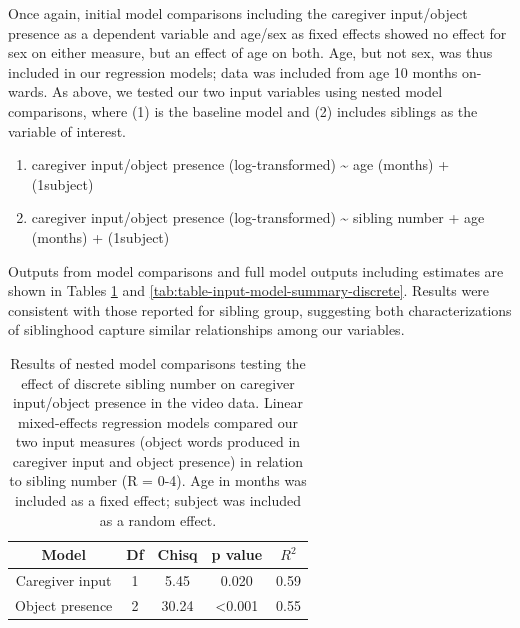 \documentclass[
  man,mask,floatsintext]{apa6}
\providecommand{\tightlist}{%
  \setlength{\itemsep}{0pt}\setlength{\parskip}{0pt}}
\begin{document}
Once again, initial model comparisons including the caregiver input/object presence as a dependent variable and age/sex as fixed effects showed no effect for sex on either measure, but an effect of age on both. Age, but not sex, was thus included in our regression models; data was included from age 10 months on-wards. As above, we tested our two input variables using nested model comparisons, where (1) is the baseline model and (2) includes siblings as the variable of interest.

\begin{enumerate}
\def\labelenumi{\arabic{enumi}.}
\tightlist
\item
  caregiver input/object presence (log-transformed) \textasciitilde{} age (months) + (1\textbar subject)
\item
  caregiver input/object presence (log-transformed) \textasciitilde{} sibling number + age (months) + (1\textbar subject)
\end{enumerate}

Outputs from model comparisons and full model outputs including estimates are shown in Tables \ref{tab:table-model-comparisons-discrete} and \ref{tab:table-input-model-summary-discrete}. Results were consistent with those reported for sibling group, suggesting both characterizations of siblinghood capture similar relationships among our variables.

\begin{longtable}[t]{ccccc}
\caption{\label{tab:table-model-comparisons-discrete}Results of nested model comparisons testing the effect of discrete sibling number on caregiver input/object presence in the video data. Linear mixed-effects regression models compared our two input measures (object words produced in caregiver input  and object presence) in relation to sibling number (R = 0-4). Age in months was included as a fixed effect; subject was included as a random effect.}\\
\toprule
Model & Df & Chisq & p value & $R^{2}$\\
\midrule
Caregiver input & 1 & 5.45 & 0.020 & 0.59\\
Object presence & 2 & 30.24 & <0.001 & 0.55\\
\bottomrule
\end{longtable}
\end{document}
